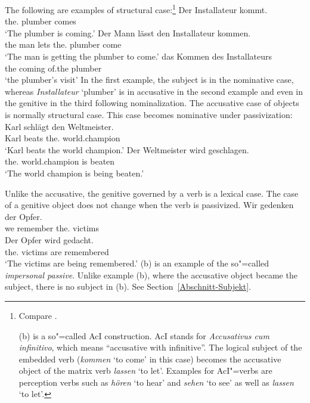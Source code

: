 The following are examples of structural case:\footnote{%
        Compare .

		(b) is a so"=called AcI construction. AcI stands for \emph{Accusativus cum infinitivo}, which means ``accusative
		with infinitive''. The logical subject of the embedded verb (\emph{kommen} `to come'
                in this case) becomes the accusative object of the matrix verb \emph{lassen} `to let'.
		Examples for AcI"=verbs are perception verbs such as \emph{hören} `to hear' and \emph{sehen} `to see'
		as well as \emph{lassen} `to let'.
}
\eal
\ex 
\gll Der Installateur kommt.\\
	 the.\nom{} plumber comes\\
\glt `The plumber is coming.'
\ex 
\gll Der Mann lässt den Installateur kommen.\\
	 the man lets the.\acc{} plumber come\\
\glt `The man is getting the plumber to come.'
\ex 
\gll das Kommen des Installateurs\\
	 the coming of.the plumber\\
\glt `the plumber's visit'
\zl
In the first example, the subject is in the nominative case, whereas \emph{Installateur} `plumber' is
in accusative in the second example and even in the genitive in the third following nominalization.
The accusative case of objects is normally structural case. This case becomes nominative under passivization:
\eal
\ex 
\gll Karl schlägt den Weltmeister.\\
     Karl beats the.\acc{} world.champion\\
\glt `Karl beats the world champion.'
\ex 
\gll Der Weltmeister wird geschlagen.\\
	 the.\nom{} world.champion is beaten\\
\glt `The world champion is being beaten.'
\zl

\noindent
Unlike the accusative, the genitive governed by a verb is a lexical case. The case of a genitive object does not change when
the verb is passivized.
\eal
\ex
\gll Wir gedenken der Opfer.\\
     we remember the.\gen{} victims\\
\ex 
\gll Der Opfer wird gedacht.\\
	 the.\gen{} victims are remembered\\
\glt `The victims are being remembered.'
\zl
(b) is an example of the so"=called \emph{impersonal passive}. Unlike example (b), where the accusative
object became the subject, there is no subject in (b). See Section~\ref{Abschnitt-Subjekt}.

